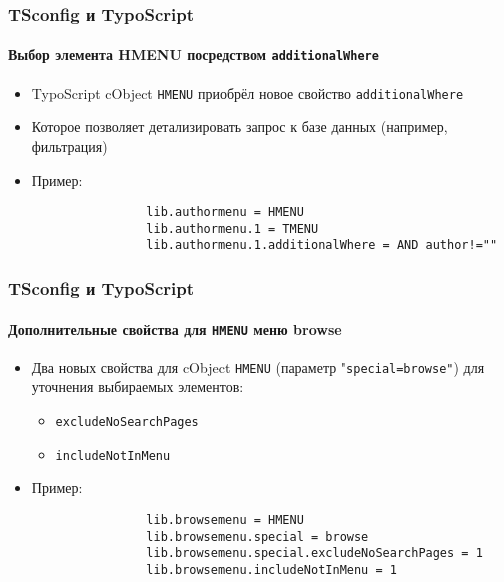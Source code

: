 \begin{frame}[fragile]
	\frametitle{TSconfig и TypoScript}
	\framesubtitle{Выбор элемента HMENU посредством \texttt{additionalWhere}}

	\begin{itemize}

		\item TypoScript cObject \texttt{HMENU} приобрёл новое свойство \texttt{additionalWhere}
		\item Которое позволяет детализировать запрос к базе данных (например, фильтрация)

		\item Пример:

			\begin{lstlisting}
				lib.authormenu = HMENU
				lib.authormenu.1 = TMENU
				lib.authormenu.1.additionalWhere = AND author!=""
			\end{lstlisting}

	\end{itemize}

\end{frame}


\begin{frame}[fragile]
	\frametitle{TSconfig и TypoScript}
	\framesubtitle{Дополнительные свойства для \texttt{HMENU} меню browse}

	\begin{itemize}
		\item Два новых свойства для cObject \texttt{HMENU} (параметр "\texttt{special=browse"})\newline
			для уточнения выбираемых элементов:
		
			\begin{itemize}
				\item \texttt{excludeNoSearchPages}
				\item \texttt{includeNotInMenu}
			\end{itemize}

		\item Пример:

			\begin{lstlisting}
				lib.browsemenu = HMENU
				lib.browsemenu.special = browse
				lib.browsemenu.special.excludeNoSearchPages = 1
				lib.browsemenu.includeNotInMenu = 1
			\end{lstlisting}

	\end{itemize}

\end{frame}

